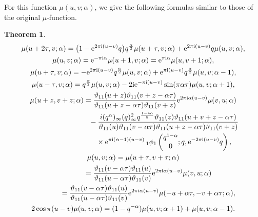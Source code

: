\documentclass[pdftex]{sigma}
\numberwithin{equation}{section}
\newtheorem{thm}{Theorem}[section]
\theoremstyle{definition}
\newcommand{\hyper}[4]{\left(\begin{matrix} #1 \\ #2 \end{matrix}; #3, #4\right)}
\begin{document}
For this function $\mu(u,v;\alpha)$, we give the following formulas similar to those of the original $\mu$-function.
\begin{thm}\label{thm:Thm1}
\begin{gather}
\label{eq:main results0}
\mu(u+2\tau,v;\alpha)
 =
 \big(1-{\rm e}^{2\pi{\rm i} (u-v)}q\big)q^\frac{\alpha}{2}\mu(u+\tau,v;\alpha)+{\rm e}^{2\pi{\rm i}(u-v)}q\mu(u,v;\alpha), \\
\label{eq:main results1}
\mu(u,v;\alpha)
 =
 {\rm e}^{-\pi{\rm i} \alpha}\mu(u+1,v;\alpha)
 =
 {\rm e}^{\pi{\rm i}\alpha}\mu(u,v+1;\alpha), \\
\label{eq:main results2}
\mu(u+\tau,v;\alpha)
 =
 -{\rm e}^{2\pi{\rm i}(u-v)}q^\frac{\alpha}{2}\mu(u,v;\alpha)
 +{\rm e}^{\pi{\rm i}(u-v)}q^\frac{\alpha}{2}\mu(u,v;\alpha-1), \\
\label{eq:main results2-2}
\mu(u-\tau,v;\alpha)
 =
 q^\frac{\alpha}{2}\mu(u,v;\alpha)
 -2{\rm i}{\rm e}^{-\pi{\rm i}(u-v)}\sin(\pi\alpha\tau)\mu(u,v;\alpha+1), \\
\label{eq:main results3}
\mu(u+z,v+z;\alpha)
 =
 \frac{\vartheta_{11}(u+z)\vartheta_{11}(v+z-\alpha\tau)}{\vartheta_{11}(u+z-\alpha\tau)\vartheta_{11}(v+z)}{\rm e}^{2\pi{\rm i}\alpha(u-v)}\mu(v,u;\alpha) \nonumber \\
\hphantom{\mu(u+z,v+z;\alpha)=}{}
 -
 \frac{i(q^\alpha)_\infty(q)_\infty^2q^\frac{1-4\alpha}{8}\vartheta_{11}(z)\vartheta_{11}(u+v+z-\alpha\tau)}{\vartheta_{11}(u)\vartheta_{11}(v-\alpha\tau)\vartheta_{11}(u+z-\alpha\tau)\vartheta_{11}(v+z)} \nonumber \\
\hphantom{\mu(u+z,v+z;\alpha)=}{}\times {\rm e}^{\pi{\rm i}(\alpha-1)(u-v)}\, {}_1\phi_1\hyper{q^{1-\alpha}}{0}{q}{{\rm e}^{-2\pi{\rm i}(u-v)}q}, \\
\label{eq:main results4}
\mu(u,v;\alpha)
 =
 \mu(u+\tau,v+\tau;\alpha) \\
\label{eq:main results4-2}
 \hphantom{\mu(u,v;\alpha)}{} =
 \frac{\vartheta_{11}(v-\alpha\tau)\vartheta_{11}(u)}{\vartheta_{11}(u-\alpha\tau)\vartheta_{11}(v)}{\rm e}^{2\pi{\rm i}\alpha(u-v)}\mu(v,u;\alpha) \\
 \hphantom{\mu(u,v;\alpha)}{} =
\label{eq:main results4-3}
 \frac{\vartheta_{11}(v-\alpha\tau)\vartheta_{11}(u)}{\vartheta_{11}(u-\alpha\tau)\vartheta_{11}(v)}{\rm e}^{2\pi{\rm i}\alpha(u-v)}\mu(-u+\alpha\tau,-v+\alpha\tau;\alpha), \\
\label{eq:main results5}
2\cos\pi(u-v)\mu(u,v;\alpha)
 =
 (1-q^{-\alpha})\mu(u,v;\alpha+1)+\mu(u,v;\alpha-1).
\end{gather}
\end{thm}
\end{document}
